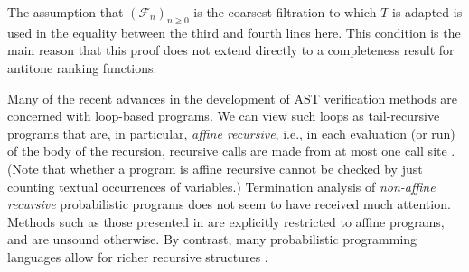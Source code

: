 The assumption that $(\mathcal F_n)_{n \geq 0}$ is the coarsest filtration to which $T$ is adapted is used in the equality between the third and fourth lines here. This condition is the main reason that this proof does not extend directly to a completeness result for antitone ranking functions.

\medskip

Many of the recent advances in the development of AST verification methods \citep{DBLP:conf/pldi/ChenH20,DBLP:conf/cav/ChakarovS13,DBLP:conf/popl/FioritiH15,DBLP:journals/pacmpl/McIverMKK18,DBLP:conf/aplas/HuangFC18,DBLP:conf/popl/ChatterjeeNZ17,DBLP:journals/pacmpl/AgrawalC018,DBLP:conf/cav/ChatterjeeFG16,DBLP:conf/lics/OlmedoKKM16,DBLP:journals/pacmpl/Huang0CG19} are concerned with loop-based programs.
We can view such loops as tail-recursive programs that are, in particular, \emph{affine recursive}, i.e., 
in each evaluation (or run) of the body of the recursion, recursive calls are made from at most one call site \citep[\S 4.1]{DBLP:journals/toplas/LagoG19}.
(Note that whether a program is affine recursive cannot be checked by just counting textual occurrences of variables.)
Termination analysis of \emph{non-affine recursive} probabilistic programs does not seem to have received much attention.
Methods such as those presented in \citep{DBLP:journals/toplas/LagoG19} are explicitly restricted to affine programs, and are unsound otherwise.
By contrast, many probabilistic programming languages allow for richer recursive structures \citep{DBLP:conf/pkdd/TolpinMW15,DBLP:conf/uai/GoodmanMRBT08,DBLP:journals/corr/MansinghkaSP14}.

\medskip


